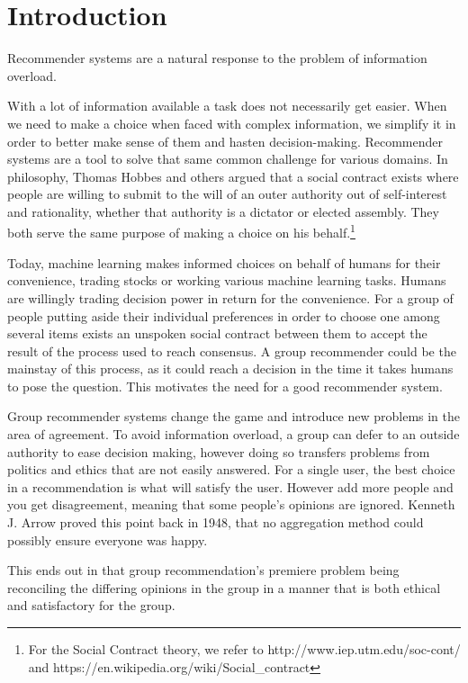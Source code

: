 \chapter{Introduction}
Recommender systems are a natural response to the problem of information overload.

With a lot of information available a task does not necessarily get easier. When we need to make a choice when faced with complex information, we simplify it in order to better make sense of them and hasten decision-making. Recommender systems are a tool to solve that same common challenge for various domains. In philosophy, Thomas Hobbes and others argued that a social contract exists where people are willing to submit to the will of an outer authority out of self-interest and rationality, whether that authority is a dictator or elected assembly. They both serve the same purpose of making a choice on his behalf.\footnote{For the Social Contract theory, we refer to http://www.iep.utm.edu/soc-cont/ and https://en.wikipedia.org/wiki/Social\_contract}

Today, machine learning makes informed choices on behalf of humans for their convenience, trading stocks or working various machine learning tasks. Humans are willingly trading decision power in return for the convenience. For a group of people putting aside their individual preferences in order to choose one among several items exists an unspoken social contract between them to accept the result of the process used to reach consensus. A group recommender could be the mainstay of this process, as it could reach a decision in the time it takes humans to pose the question. This motivates the need for a good recommender system.

Group recommender systems change the game and introduce new problems in the area of agreement. To avoid information overload, a group can defer to an outside authority to ease decision making, however doing so transfers problems from politics and ethics that are not easily answered. For a single user, the best choice in a recommendation is what will satisfy the user. However add more people and you get disagreement, meaning that some people's opinions are ignored. Kenneth J. Arrow proved this point back in 1948, that no aggregation method could possibly ensure everyone was happy.\cite{arrow}

This ends out in that group recommendation's premiere problem being reconciling the differing opinions in the group in a manner that is both ethical and satisfactory for the group.

